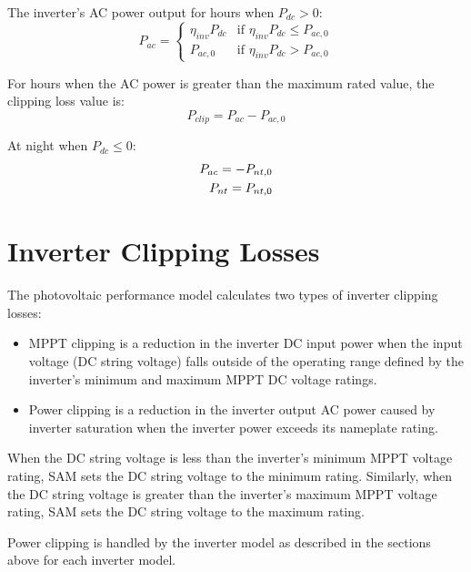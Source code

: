 \documentclass[12pt,letterpaper]{article}
\begin{document}
The inverter's AC power output for hours when $P_{dc}>0$:
\begin{equation}
P_{ac} = \left\{
\begin{array}{ll}
\eta_{inv} P_{dc} & \text{if $\eta_{inv} P_{dc} \leq P_{ac,0}$}\\
P_{ac,0} & \text{if $\eta_{inv} P_{dc} > P_{ac,0}$} 
\end{array}\right.
\end{equation}

For hours when the AC power is greater than the maximum rated value, the clipping loss value is:
\begin{equation}
P_{clip} = P_{ac} - P_{ac,0}
\end{equation}

At night when $P_{dc} \leq 0$:
\begin{align}
P_{ac} = -P_{nt,0} \notag\\
P_{nt} = P_{nt,0}
\end{align}

\section{Inverter Clipping Losses}\label{sec-invclip}

The photovoltaic performance model calculates two types of inverter clipping losses:

\begin{itemize}
\item MPPT clipping is a reduction in the inverter DC input power when the input voltage (DC string voltage) falls outside of the operating range defined by the inverter's minimum and maximum MPPT DC voltage ratings.
\item Power clipping is a reduction in the inverter output AC power caused by inverter saturation when the inverter power exceeds its nameplate rating.
\end{itemize}

When the DC string voltage is less than the inverter's minimum MPPT voltage rating, SAM sets the DC string voltage to the minimum rating. Similarly, when the DC string voltage is greater than the inverter's maximum MPPT voltage rating, SAM sets the DC string voltage to the maximum rating.

Power clipping is handled by the inverter model as described in the sections above for each inverter model.
\end{document}
